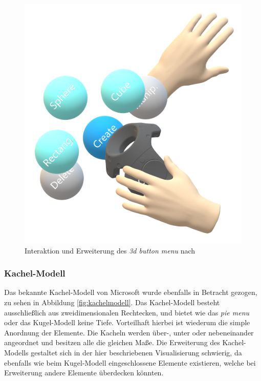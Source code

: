 \begin{figure}[h]
\captionsetup{width=.7\linewidth}
\includegraphics[scale=0.5]{Bilder/Hauptteil/konzept19a}
\centering
\caption{Interaktion und Erweiterung des \textit{3d button menu} nach~\cite[p.~36-37]{wheelpickerpiemenu}}
\label{fig:ballmodell}
\end{figure}

\subsubsection*{Kachel-Modell}
\noindent Das bekannte Kachel-Modell von Microsoft wurde ebenfalls in Betracht gezogen, zu sehen in Abbildung \ref{fig:kachelmodell}. Das Kachel-Modell besteht ausschließlich aus zweidimensionalen Rechtecken, und bietet wie das \textit{pie menu} oder das Kugel-Modell keine Tiefe. Vorteilhaft hierbei ist wiederum die simple Anordnung der Elemente. Die Kacheln werden über-, unter oder nebeneinander angeordnet und besitzen alle die gleichen Maße. Die Erweiterung des Kachel-Modells gestaltet sich in der hier beschriebenen Visualisierung schwierig, da ebenfalls wie beim Kugel-Modell eingeschlossene Elemente existieren, welche bei Erweiterung andere Elemente überdecken könnten.

